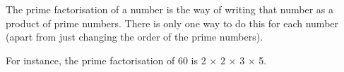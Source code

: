 The prime factorisation of a number is the way of writing that number
as a product of prime numbers. There is only one way to do this
for each number (apart from just changing the order of the prime numbers).
\par
For instance, the prime factorisation of 60 is 2 \ensuremath{ \times } 2 \ensuremath{ \times } 3 \ensuremath{ \times } 5.